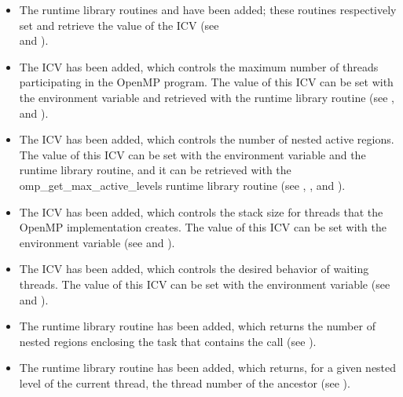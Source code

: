 \begin{itemize}
\item The runtime library routines  and  
have been added; these routines respectively set and retrieve the value of the 
 ICV (see\\
 and 
).

\item The  ICV has been added, which controls the maximum number of 
threads participating in the OpenMP program. The value of this ICV can be set with 
the  environment variable and retrieved with the 
 runtime library routine (see 
, 
 and 
).

\item The  ICV has been added, which controls the number of nested 
active  regions. The value of this ICV can be set with the 
 environment variable and the 
 runtime library routine, and it can be retrieved
with the omp\_get\_max\_active\_levels runtime library routine (see 
, 
, 
 and 
).

\item The  ICV has been added, which controls the stack size for threads that 
the OpenMP implementation creates. The value of this ICV can be set with the 
 environment variable (see 
 and 
).

\item The  ICV has been added, which controls the desired behavior of 
waiting threads. The value of this ICV can be set with the  
environment variable (see 
 and 
).

\item The  runtime library routine has been added, which returns the 
number of nested  regions enclosing the task that contains the call (see 
). 

\item The  runtime library routine has been added, 
which returns, for a given nested level of the current thread, the thread number of the 
ancestor (see 
).


\end{itemize}
